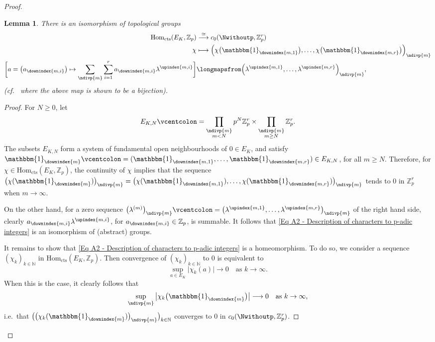 \documentclass[a4paper, reqno, 10pt]{amsart}
\newtheorem{lemma}[theorem]{Lemma}
\theoremstyle{definition}
\numberwithin{equation}{section}
\newcommand{\abs}[1]{{\lvert{#1}\rvert}}
\newcommand{\cont}{{\mathrm{cts}}}
\newcommand{\defeq}{\vcentcolon=}
\newcommand{\Hom}{{\mathrm{Hom}}}
\newcommand{\lra}{\longrightarrow}
\newcommand{\lto}{\longmapsto}
\newcommand{\mto}{\mapsto}
\newcommand{\ra}{\rightarrow}
\newcommand{\BN}{{\mathbb {N}}}
\newcommand{\BZ}{{\mathbb {Z}}}
\begin{document}
\begin{proof}
	
	\begin{lemma}
		There is an isomorphism of topological groups
		\begin{align}\label{Eq A2 - Description of characters to p-adic integers}
			\Hom_\cont (E_K, \BZ_p) &\overset{\cong}{\lra} c_0(\Nwithoutp, \BZ_p^r) \\
			\chi &\lto \Big( \chi\big(\mathbbm{1}_\downindex{m,1}\big), \ldots ,\chi\big(\mathbbm{1}_\downindex{m,r}\big) \Big)_\ndivp{m} \nonumber \\
			\bigg[ a= \big(a_\downindex{m,i} \big) \mto \sum_\ndivp{m}\sum_{i=1}^r a_\downindex{{m,i}} \lambda^\upindex{{m,i}} \bigg] &\longmapsfrom \Big(  \lambda^\upindex{{m,1}},\ldots, \lambda^\upindex{{m,r}}  \Big)_\ndivp{m} \nonumber ,
		\end{align}
		(cf.\ \cite[Prop.\ 3.5 and 3.6]{DavisWan14LFunctOfpAdicChar} where the above map is shown to be a bijection).
	\end{lemma}
	\begin{proof}
		For $N \geq 0$, let
		\begin{equation*}
			E_{K,N} \defeq \prod_{\substack{\ndivp{m} \\ m< N}}  p^N \BZ_p^r \times \prod_{\substack{\ndivp{m} \\ m\geq N}}  \BZ_p^r.
		\end{equation*}
		The subsets $E_{K,N}$ form a system of fundamental open neighbourhoods of $0 \in E_K$, and satisfy $\mathbbm{1}_\downindex{m} \defeq (\mathbbm{1}_\downindex{m,1},\ldots,\mathbbm{1}_\downindex{m,r}) \in E_{K,N}$, for all $m\geq N$.
		Therefore, for $\chi \in \Hom_\cont (E_K, \BZ_p)$, the continuity of $\chi$ implies that the sequence $\big( \chi(\mathbbm{1}_\downindex{m})\big)_\ndivp{m} = \big( \chi(\mathbbm{1}_\downindex{{m,1}}), \ldots ,\chi(\mathbbm{1}_\downindex{m,r}) \big)_\ndivp{m}$ tends to $0$ in $\BZ_p^r$ when $m \ra \infty$.
		
		
		On the other hand, for a zero sequence $\big( \lambda^{(m)} \big)_\ndivp{m} \defeq \big( \lambda^\upindex{{m,1}},\ldots, \lambda^\upindex{{m,r}} \big)_\ndivp{m}$ of the right hand side, clearly $a_\downindex{{m,i}}\lambda^\upindex{{m,i}}$, for $a_\downindex{{m,i}} \in \BZ_p$, is summable.
		It follows that \eqref{Eq A2 - Description of characters to p-adic integers} is an isomorphism of (abstract) groups.
		
		
		It remains to show that \eqref{Eq A2 - Description of characters to p-adic integers} is a homeomorphism.
		To do so, we consider a sequence $(\chi_k)_{k\in \BN}$ in $\Hom_\cont (E_K,\BZ_p)$.
		Then convergence of $(\chi_k)_{k\in \BN}$ to $0$ is equivalent to 
		\begin{equation*}
			\sup_{a \in E_K} \abs{\chi_k(a) } \lra 0 \quad\text{as $k \ra \infty$.}
		\end{equation*}
		When this is the case, it clearly follows that
		\begin{equation*}
			\sup_{\ndivp{m}} \big\lvert \chi_k \big(\mathbbm{1}_\downindex{m}\big)  \big\rvert \lra 0 \quad\text{as $k\ra \infty$,}
		\end{equation*}
		i.e.\ that $\big( \big(\chi_k (\mathbbm{1}_\downindex{m}) \big)_{\ndivp{m}} \big)_{k\in \BN}$ converges to $0$ in $c_0 (\Nwithoutp , \BZ_p^r)$.
		

\end{proof}
\end{proof}
\end{document}

